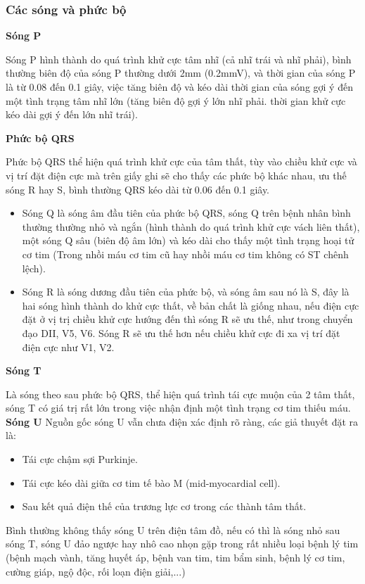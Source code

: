 \subsubsection{Các sóng và phức bộ}
\textbf{Sóng P}

Sóng P hình thành do quá trình khử cực tâm nhĩ (cả nhĩ trái và nhĩ phải), bình thường biên độ của sóng P thường dưới 2mm (0.2mmV), và thời gian của sóng P là từ 0.08 đến 0.1 giây, việc tăng biên độ và kéo dài thời gian của sóng gợi ý đến một tình trạng tâm nhĩ lớn (tăng biên độ gợi ý lớn nhĩ phải. thời gian khử cực kéo dài gợi ý đến lớn nhĩ trái).

\textbf{Phức bộ QRS}

Phức bộ QRS thể hiện quá trình khử cực của tâm thất, tùy vào chiều khử cực và vị trí đặt điện cực mà trên giấy ghi sẽ cho thấy các phức bộ khác nhau, ưu thế sóng R hay S, bình thường QRS kéo dài từ 0.06 đến 0.1 giây.
\begin{itemize}
    \item Sóng Q là sóng âm đầu tiên của phức bộ QRS, sóng Q trên bệnh nhân bình thường thường nhỏ và ngắn (hình thành do quá trình khử cực vách liên thất), một sóng Q sâu (biên độ âm lớn) và kéo dài cho thấy một tình trạng hoại tử cơ tim (Trong nhồi máu cơ tim cũ hay nhồi máu cơ tim không có ST chênh lệch).
    \item Sóng R là sóng dương đầu tiên của phức bộ, và sóng âm sau nó là S, đây là hai sóng hình thành do khử cực thất, về bản chất là giống nhau, nếu điện cực đặt ở vị trị chiều khử cực hướng đến thì sóng R sẽ ưu thế, như trong chuyển đạo DII, V5, V6. Sóng R sẽ ưu thế hơn nếu chiều khử cực đi xa vị trí đặt điện cực như V1, V2.
\end{itemize}

\textbf{Sóng T}

Là sóng theo sau phức bộ QRS, thể hiện quá trình tái cực muộn của 2 tâm thất, sóng T có giá trị rất lớn trong việc nhận định một tình trạng cơ tim thiếu máu.
\textbf{Sóng U}
Nguồn gốc sóng U vẫn chưa điện xác định rõ ràng, các giả thuyết đặt ra là:
\begin{itemize}
    \item Tái cực chậm sợi Purkinje.
    \item Tái cực kéo dài giữa cơ tim tế bào M (mid-myocardial cell).
    \item Sau kết quả điện thế của trương lực cơ trong các thành tâm thất.
\end{itemize}
Bình thường không thấy sóng U trên điện tâm đồ, nếu có thì là sóng nhỏ sau sóng T, sóng U đảo ngược hay nhô cao nhọn gặp trong rất nhiều loại bệnh lý tim (bệnh mạch vành, tăng huyết áp, bệnh van tim, tim bẩm sinh, bệnh lý cơ tim, cường giáp, ngộ độc, rối loạn điện giải,...)
